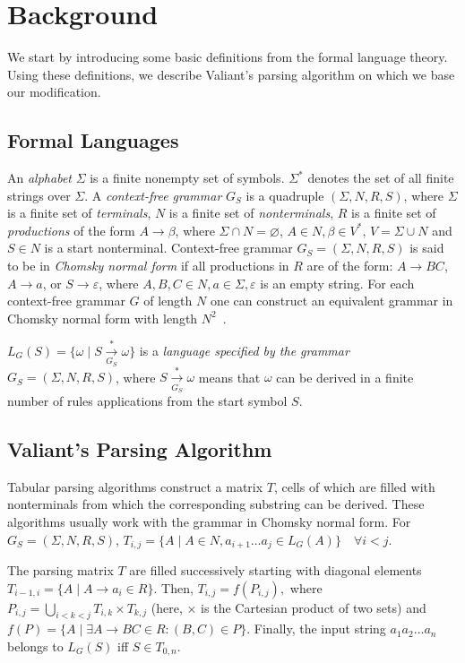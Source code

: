 \section{Background}

We start by introducing some basic definitions from the formal language theory. Using these definitions, we describe Valiant's parsing algorithm on which we base our modification. 

\subsection{Formal Languages}

An \emph{alphabet} $\Sigma$ is a finite nonempty set of symbols.
$\Sigma^{*}$ denotes the set of all finite strings over $\Sigma$.
A \emph{context-free grammar} $G_S$ is a quadruple $(\Sigma, N, R, S)$, where $\Sigma$ is a finite set of \emph{terminals}, $N$ is a finite set of \emph{nonterminals}, $R$ is a finite set of \emph{productions} of the form $A \rightarrow \beta$, where $\Sigma \cap N = \varnothing$, $A \in N, \beta \in V^{*}$, $V = \Sigma \cup N$ and $S \in N$ is a start nonterminal.
Context-free grammar $G_S = (\Sigma, N, R, S)$ is said to be in \emph{Chomsky normal form} if all productions in $R$ are of the form: $A \rightarrow BC$, $A \rightarrow a$, or $S \rightarrow \varepsilon$, where $A, B, C \in N, a \in \Sigma, \varepsilon$ is an empty string.
For each context-free grammar $G$ of length $N$ one can construct an equivalent grammar in Chomsky normal form with length $N^2$~\cite{hopcroft2008introduction}.

$L_{G}(S) = \{ \omega \mid S\xrightarrow[G_S]{*} \omega\}$ is a \emph{language specified by the grammar} $G_{S} = (\Sigma, N, R, S)$, where $S \xrightarrow[G_S]{*} \omega$ means that $\omega$ can be derived in a finite number of rules applications from the start symbol $S$.

\subsection{Valiant's Parsing Algorithm}

Tabular parsing algorithms construct a matrix $T$, cells of which are filled with nonterminals from which the corresponding substring can be derived. 
These algorithms usually work with the grammar in Chomsky normal form.
For $G_S=(\Sigma, N, R, S)$, $T_{i, j} =  \{ A \mid A \in N, a_{i + 1} \dots a_{j} \in L_{G}(A)\} \quad \forall i < j$.

The parsing matrix $T$ are filled successively starting with diagonal elements $T_{i - 1, i} = \{ A \mid A \rightarrow a_{i} \in R\}.$
Then, $T_{i, j} = f(P_{i, j}),$ where
$P_{i, j} = \bigcup\limits_{i < k < j} T_{i,k} \times T_{k, j}$ (here, $\times$ is the Cartesian product of two sets) and
$f(P) = \{A \mid \exists A \rightarrow BC \in R : (B, C) \in P\}.$
Finally, the input string $a_{1}a_{2} \dots a_{n}$ belongs to $L_{G}(S)$ iff $S \in T_{0, n}$.

